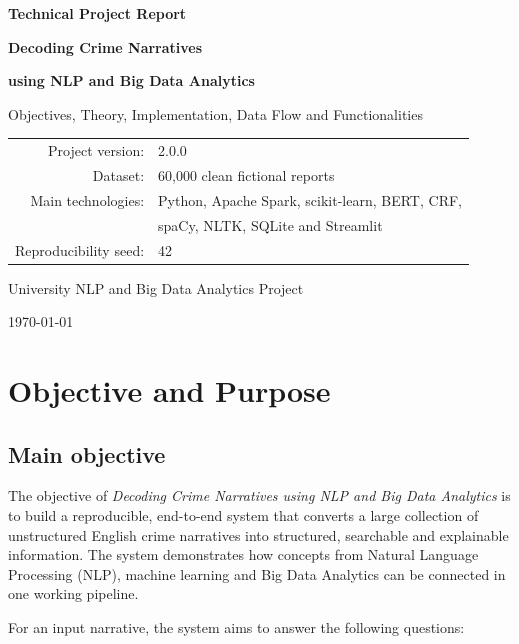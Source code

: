 \documentclass[12pt,a4paper]{report}
\newcommand{\project}{\textit{Decoding Crime Narratives using NLP and Big Data Analytics}}
\begin{document}
\begin{titlepage}
  \centering
  \vspace*{1.2cm}
  {\Large\color{Primary}\textbf{Technical Project Report}\par}
  \vspace{0.8cm}
  {\Huge\bfseries Decoding Crime Narratives\par}
  \vspace{0.25cm}
  {\LARGE\bfseries using NLP and Big Data Analytics\par}
  \vspace{1.0cm}
  {\Large Objectives, Theory, Implementation, Data Flow and Functionalities\par}
  \vfill
  \begin{tabular}{rl}
    Project version: & 2.0.0 \\
    Dataset: & 60,000 clean fictional reports \\
    Main technologies: & Python, Apache Spark, scikit-learn, BERT, CRF, \\
                       & spaCy, NLTK, SQLite and Streamlit \\
    Reproducibility seed: & 42
  \end{tabular}
  \vfill
  {\large University NLP and Big Data Analytics Project\par}
  \vspace{0.5cm}
  {\large \today\par}
\end{titlepage}

\tableofcontents
\clearpage
\listoffigures
\clearpage
{}

\chapter{Objective and Purpose}

\section{Main objective}

The objective of \project{} is to build a reproducible, end-to-end system that converts a large collection of unstructured English crime narratives into structured, searchable and explainable information. The system demonstrates how concepts from Natural Language Processing (NLP), machine learning and Big Data Analytics can be connected in one working pipeline.

For an input narrative, the system aims to answer the following questions:
\end{document}
